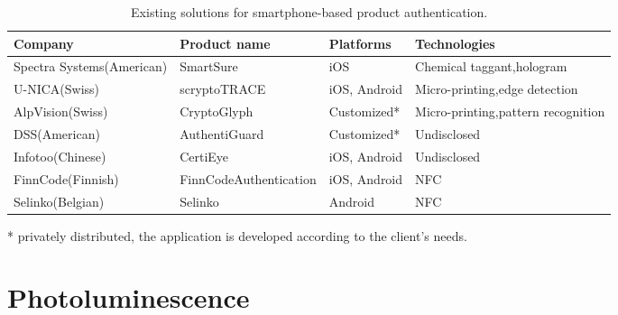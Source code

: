 \documentclass[thesis.tex]{subfiles}
\begin{document}
\begin{table}[ht]
	\caption{Existing solutions for smartphone-based product authentication.} \label{table:existing-solutions}

	\begin{center}
	\begin{tabular}{| m{2cm} | m{3.25cm} | m{3cm} | m{3.75cm} |}

		\hline
		\textbf{Company}				&	\textbf{Product name}			&	\textbf{Platforms}			&	\textbf{Technologies} \\ \hline
		Spectra Systems\newline (American)		&	SmartSure						&	iOS							&	Chemical taggant,\newline hologram \\ \hline
		U-NICA\newline (Swiss)			&	scryptoTRACE\textregistered		&	iOS, Android				&	Micro-printing,\newline edge detection \\ \hline
		AlpVision\newline (Swiss)		&	CryptoGlyph\textregistered		&	Customized\footnotesize{*}	&	Micro-printing,\newline pattern recognition \\ \hline
		DSS\newline (American)			&	AuthentiGuard					&	Customized\footnotesize{*}	&	Undisclosed \\ \hline
		Infotoo\newline (Chinese)		&	CertiEye						&	iOS, Android				&	Undisclosed \\ \hline
		FinnCode\newline (Finnish)		&	FinnCode\newline Authentication	&	iOS, Android				&	NFC \\ \hline
		Selinko\newline (Belgian)		&	Selinko							&	Android						&	NFC \\
		\hline
	\end{tabular}
	\end{center}
	\scriptsize{*} \small{privately distributed, the application is developed according to the client's needs.}
\end{table}

\section{Photoluminescence}
\label{section:photoluminescence}
\end{document}
